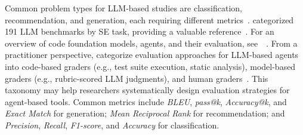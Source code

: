 Common problem types for LLM-based studies are classification, recommendation, and generation, each requiring different metrics~\cite{DBLP:journals/tosem/HouZLYWLLLGW24}. \citeauthor{DBLP:journals/corr/abs-2505-08903} categorized 191 LLM benchmarks by SE task, providing a valuable reference~\cite{DBLP:journals/corr/abs-2505-08903}. For an overview of code foundation models, agents, and their evaluation, see~\citeauthor{yang2025code}~\cite{yang2025code}. From a practitioner perspective, \citeauthor{Anthropic2025evals} categorize evaluation approaches for LLM-based agents into code-based graders (e.g., test suite execution, static analysis), model-based graders (e.g., rubric-scored LLM judgments), and human graders~\cite{Anthropic2025evals}. This taxonomy may help researchers systematically design evaluation strategies for agent-based tools. Common metrics include \emph{BLEU}, \emph{pass@k}, \emph{Accuracy@k}, and \emph{Exact Match} for generation; \emph{Mean Reciprocal Rank} for recommendation; and \emph{Precision}, \emph{Recall}, \emph{F1-score}, and \emph{Accuracy} for classification.


